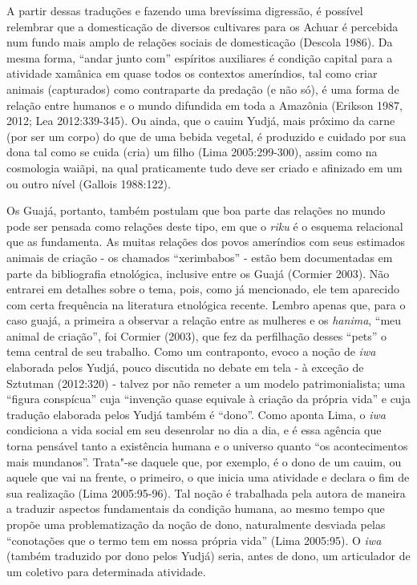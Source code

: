 A partir dessas traduções e fazendo uma brevíssima digressão, é possível
relembrar que a domesticação de diversos cultivares para os Achuar é
percebida num fundo mais amplo de relações sociais de domesticação
(Descola 1986). Da mesma forma, ``andar junto com'' espíritos auxiliares é
condição capital para a atividade xamânica em quase todos os contextos
ameríndios, tal como criar animais (capturados) como contraparte da
predação (e não só), é uma forma de relação entre humanos e o mundo
difundida em toda a Amazônia (Erikson 1987, 2012; Lea 2012:339-345). Ou
ainda, que o cauim Yudjá, mais próximo da carne (por ser um corpo) do
que de uma bebida vegetal, é produzido e cuidado por sua dona tal como
se cuida (cria) um filho (Lima 2005:299-300), assim como na cosmologia
waiãpi, na qual praticamente tudo deve ser criado e afinizado em um ou
outro nível (Gallois 1988:122).

Os Guajá, portanto, também postulam que boa parte das relações no mundo
pode ser pensada como relações deste tipo, em que o \emph{riku} é o
esquema relacional que as fundamenta. As muitas relações dos povos
ameríndios com seus estimados animais de criação - os chamados
``xerimbabos'' - estão bem documentadas em parte da bibliografia
etnológica, inclusive entre os Guajá (Cormier 2003). Não entrarei em
detalhes sobre o tema, pois, como já mencionado, ele tem aparecido com
certa frequência na literatura etnológica recente. Lembro apenas que,
para o caso guajá, a primeira a observar a relação entre as mulheres e
os \emph{hanima}, ``meu animal de criação'', foi Cormier (2003), que fez
da perfilhação desses ``pets'' o tema central de seu trabalho. Como um
contraponto, evoco a noção de \emph{iwa} elaborada pelos Yudjá, pouco
discutida no debate em tela - à exceção de Sztutman (2012:320) - talvez
por não remeter a um modelo patrimonialista; uma ``figura conspícua'' cuja
``invenção quase equivale à criação da própria vida'' e cuja tradução
elaborada pelos Yudjá também é ``dono''. Como aponta Lima, o \emph{iwa}
condiciona a vida social em seu desenrolar no dia a dia, e é essa
agência que torna pensável tanto a existência humana e o universo quanto
``os acontecimentos mais mundanos''. Trata"-se daquele que, por exemplo,
é o dono de um cauim, ou aquele que vai na frente, o primeiro, o que
inicia uma atividade e declara o fim de sua realização (Lima
2005:95-96). Tal noção é trabalhada pela autora de maneira a traduzir
aspectos fundamentais da condição humana, ao mesmo tempo que propõe uma
problematização da noção de dono, naturalmente desviada pelas
``conotações que o termo tem em nossa própria vida'' (Lima 2005:95). O
\emph{iwa} (também traduzido por dono pelos Yudjá) seria, antes de dono,
um articulador de um coletivo para determinada atividade.

